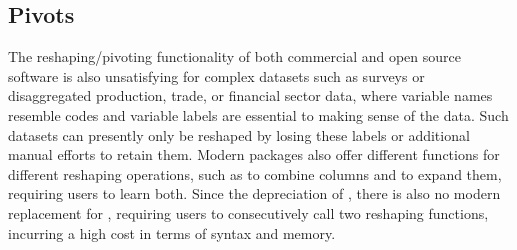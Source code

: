 \documentclass[nojss]{jss} %
\begin{document}
\subsection{Pivots}
%
The reshaping/pivoting functionality of both commercial and open source software is also unsatisfying for complex datasets such as surveys or disaggregated production, trade, or financial sector data, where variable names resemble codes and variable labels are essential to making sense of the data. Such datasets can presently only be reshaped by losing these labels or additional manual efforts to retain them. Modern  packages also offer different functions for different reshaping operations, such as  to combine columns and  to expand them, requiring users to learn both. Since the depreciation of  \citep{rreshape2}, there is also no modern replacement for , requiring  users to consecutively call two reshaping functions, incurring a high cost in terms of syntax and memory. \newline
\end{document}
